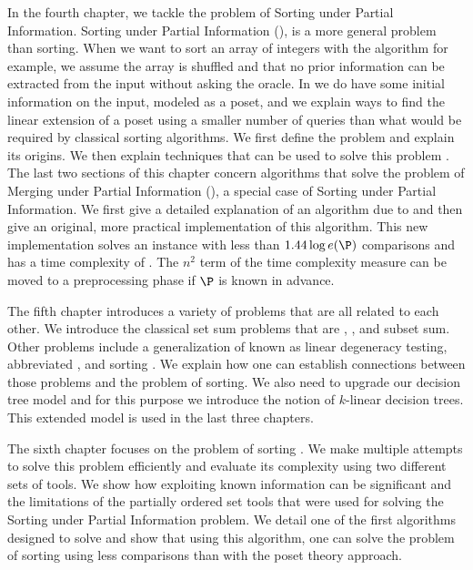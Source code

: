 In the fourth chapter, we tackle the problem of Sorting under Partial
Information. Sorting under Partial Information (\SUPI), is
a more general problem than sorting. When we want to sort an array of integers
with the \quicksort algorithm for example, we assume the array is shuffled and
that no prior information can be extracted from the input without asking the
oracle. In \SUPI we do have some initial information on the input, modeled as a
poset, and we explain ways
to find the linear extension of a poset using a smaller number of queries than
what would be required by classical sorting algorithms. We first define
the problem and explain its origins. We then explain techniques that can
be used to solve this problem \cite{kahn:1995,cardinal:2013}. The
last two sections of this chapter concern
algorithms that solve the problem of Merging under Partial Information
(\MUPI), a special case of Sorting under Partial Information. We first
give a detailed explanation of an algorithm due to \citet*{linial:1984} and
then give an original, more practical implementation of this algorithm. This
new implementation solves an \MUPI instance with less than \(1.44 \log e(\P)\)
comparisons and has a time complexity of . The
\(n^2\) term of the time complexity measure can be moved to a preprocessing
phase if \(\P\) is known in advance.

The fifth chapter introduces a variety of problems that are all related to
each other. We introduce the classical set sum problems that are
\threeSUM, \kSUM, and subset sum. Other problems include a generalization of
\kSUM known as linear degeneracy testing, abbreviated \kLDT, and sorting \XY.
We explain how one can establish connections between those problems and the problem
of sorting. We also need to upgrade our decision tree model and for this
purpose we introduce the notion of \(k\)-linear decision trees. This
extended model is used in the last three chapters.

The sixth chapter focuses on the problem of sorting \XY. We make
multiple attempts to solve this problem efficiently and evaluate its complexity
using two different sets of tools. We show how exploiting known information
can be significant and the limitations of the partially ordered set tools that
were used for solving the Sorting under Partial Information problem. We
detail one of the first algorithms designed to solve \SUPI
\cite{fredman:1976} and
show that using this algorithm, one can solve the problem of sorting \XY
using less comparisons than with the poset theory approach.

